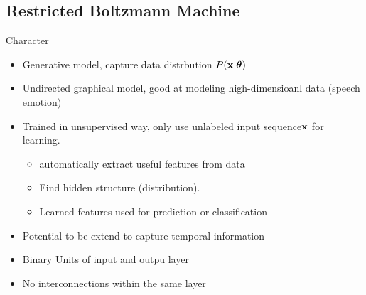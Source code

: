     \subsection{Restricted Boltzmann Machine}
	\begin{frame}[t]{Character}
	 \begin{itemize}
	  \item Generative model, capture data distrbution $P(\mathbf{x}|\boldsymbol{\theta})$
	  \item Undirected graphical model, good at modeling high-dimensioanl data (speech emotion)
	  \item Trained in unsupervised way, only use unlabeled input sequence$\mathbf{x}$ for learning. 
		  \begin{itemize}
		   \item automatically extract useful features from data 
		   \item Find hidden structure (distribution). 
		   \item Learned features used for prediction or classification
		  \end{itemize}
	  \item Potential to be extend to capture temporal information
	  \item Binary Units of input and outpu layer
	  \item No interconnections within the same layer
	 \end{itemize}


	

	\end{frame}
	
